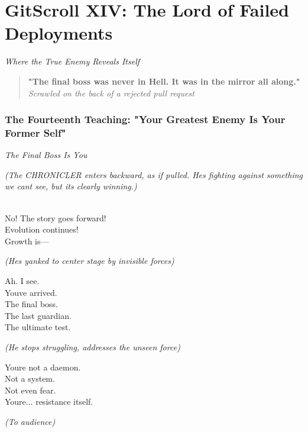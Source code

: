 \chapter{GitScroll XIV: The Lord of Failed Deployments}
\label{chap:17-The-Lord-of-Failed-Deployments}

\emph{Where the True Enemy Reveals Itself}

\begin{quote}
\textbf{"The final boss was never in Hell. It was in the mirror all along."}\\
\emph{Scrawled on the back of a rejected pull request}
\end{quote}

\subsection{The Fourteenth Teaching: "Your Greatest Enemy Is Your Former Self"}\label{the-fourteenth-teaching-your-greatest-enemy-is-your-former-self}

\label{performing_arts-invocation-before-the-scroll}

\emph{The Final Boss Is You}

\emph{(The CHRONICLER enters backward, as if pulled. He\textquotesingle s fighting against something we can\textquotesingle t see, but it\textquotesingle s clearly winning.)}

\\
No! The story goes forward!\\
Evolution continues!\\
Growth is---

\emph{(He\textquotesingle s yanked to center stage by invisible forces)}

Ah. I see.\\
You\textquotesingle ve arrived.\\
The final boss.\\
The last guardian.\\
The ultimate test.

\emph{(He stops struggling, addresses the unseen force)}

You\textquotesingle re not a daemon.\\
Not a system.\\
Not even fear.\\
You\textquotesingle re... resistance itself.

\emph{(To audience)}

